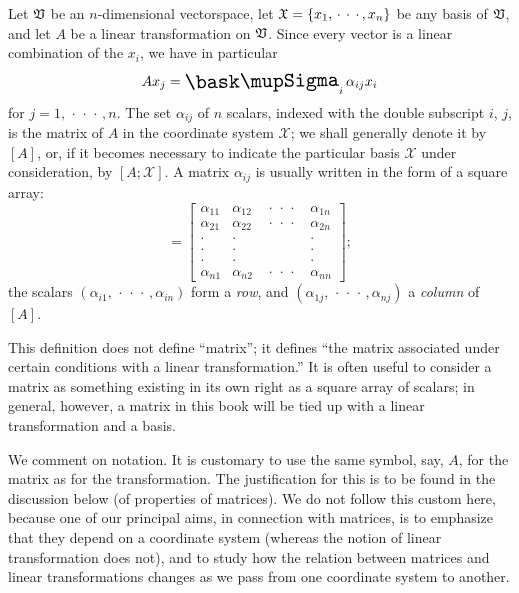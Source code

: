 \begin{definition}
    Let \(\frak{V}\) be an \(n\)-dimensional vectorspace, let \(\frak{X} =
    \{x_1, \,\cdot\,\cdot\,\cdot\, , x_n\}\)  be any basis of \(\frak{V}\), and let \(A\) be a
    linear transformation on \(\frak{V}\). Since every vector is a linear
    combination of the \(x_i\), we have in particular
    \begin{equation*}
        Ax_j = \sumx_i \alpha_{ij} x_i
    \end{equation*}
    for \(j = 1,\,\cdot\,\cdot\,\cdot\,, n\). The set \(\alpha_{ij}\) of \(n\) scalars, indexed with the double subscript \(i\), \(j\), is the matrix of \(A\) in the coordinate system \(\mathcal{X}\); we shall generally denote it by \([A]\), or, if it becomes necessary to indicate the particular basis \(\mathcal{X}\) under consideration, by \([A; \mathcal{X}]\). A matrix
    \(\alpha_{ij}\) is usually written in the form of a square array:
    \begin{equation*}
        [A] = \begin{bmatrix}
            \alpha_{11} & \alpha_{12} & \,\cdot\,\cdot\,\cdot\, & \alpha_{1n} \\
            \alpha_{21} & \alpha_{22} & \,\cdot\,\cdot\,\cdot\, & \alpha_{2n} \\
            \cdot & \cdot & & \cdot \\
            \cdot & \cdot & & \cdot \\
            \cdot & \cdot & & \cdot \\
            \alpha_{n1} & \alpha_{n2} & \,\cdot\,\cdot\,\cdot\, & \alpha_{nn}
        \end{bmatrix};
    \end{equation*}
    the scalars \((\alpha_{i1}, \,\cdot\,\cdot\,\cdot\,, \alpha_{in})\) form a \emph{row}, and \( (\alpha_{1j}, \,\cdot\,\cdot\,\cdot\,, \alpha_{nj})\) a \emph{column} of \([A]\).
\end{definition}

This definition does not define ``matrix''; it defines ``the matrix associated
under certain conditions with a linear transformation.'' It is often useful to
consider a matrix as something existing in its own right as a square array of
scalars; in general, however, a matrix in this book will be tied up with a
linear transformation and a basis.

We comment on notation. It is customary to use the same symbol, say, \(A\), for
the matrix as for the transformation. The justification for this is to be found
in the discussion below (of properties of matrices). We do not follow this
custom here, because one of our principal aims, in connection with matrices, is
to emphasize that they depend on a coordinate system (whereas the notion of
linear transformation does not), and to study how the relation between matrices
and linear transformations changes as we pass from one coordinate system to
another.

